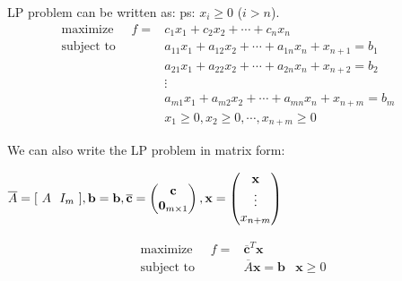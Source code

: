 \documentclass[9pt]{article}
\begin{document}
\vspace{-9pt}
\begin{multicols}{2}

    LP problem can be written as: \quad \quad ps: $x_{i}\geq0$ ($i>n$).
    \begin{align*}
        \text{maximize} \quad \ \ f = & c_1x_1 + c_2x_2 + \cdots + c_nx_n & \\
        \text{subject to} \quad \qquad & a_{11}x_1 + a_{12}x_2 + \cdots + a_{1n}x_n + x_{n+1} = b_1 & \\
                                & a_{21}x_1 + a_{22}x_2 + \cdots + a_{2n}x_n + x_{n+2} = b_2 & \\
                                & \vdots & \\
                                & a_{m1}x_1 + a_{m2}x_2 + \cdots + a_{mn}x_n + x_{n+m} = b_m & \\
                                & x_1 \geq 0, x_2 \geq 0, \cdots, x_{n+m} \geq 0 &
    \end{align*}
    
    \columnbreak

    We can also write the LP problem in matrix form:

    \vspace{5pt}
    $
    \overline{A}= [ \ A  \ \ I_m \ ]
    ,\mathbf{b}=\mathbf{b}
    ,\overline{\mathbf{c}}=
    \begin{pmatrix}
        \mathbf{c} \\
        \mathbf{0}_{\tiny m\times 1}
    \end{pmatrix}
    ,\mathbf{x}=
    \begin{pmatrix}
        \mathbf{x} \\
        \vdots \\
        x_{\tiny n+m}
    \end{pmatrix}
    $

    \begin{align*}
        \text{maximize} \quad \ \ f = & \overline{\mathbf{c}}^T\mathbf{x} & \\
        \text{subject to} \quad \qquad & \overline{A}\mathbf{x} = \mathbf{b} & \mathbf{x} \geq 0 \\
    \end{align*}

\end{multicols}
\end{document}
